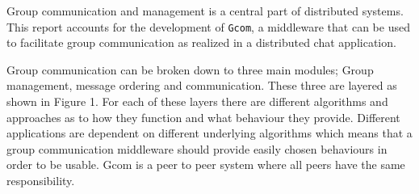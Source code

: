 Group communication and management is a central part of distributed systems.
This report accounts for the development of \texttt{Gcom}, a middleware that can be used to facilitate group communication as realized in a distributed chat application.

Group communication can be broken down to three main modules; Group management, message ordering and communication. 
These three are layered as shown in Figure 1.
For each of these layers there are different algorithms and approaches as to how they function and what behaviour they provide.
Different applications are dependent on different underlying algorithms which means that a group communication middleware should provide easily chosen behaviours in order to be usable.
Gcom is a peer to peer system where all peers have the same responsibility.
